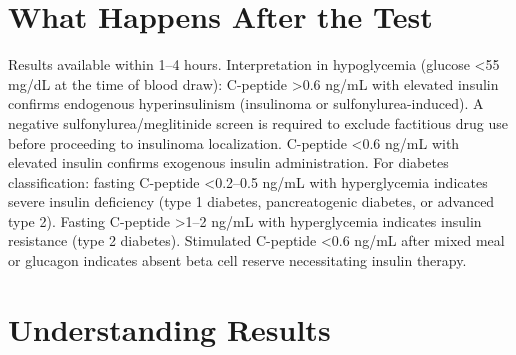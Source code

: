 \section*{What Happens After the Test}
Results available within 1--4 hours. Interpretation in hypoglycemia (glucose <55 mg/dL at the time of blood draw): C-peptide >0.6 ng/mL with elevated insulin confirms endogenous hyperinsulinism (insulinoma or sulfonylurea-induced). A negative sulfonylurea/meglitinide screen is required to exclude factitious drug use before proceeding to insulinoma localization. C-peptide <0.6 ng/mL with elevated insulin confirms exogenous insulin administration. For diabetes classification: fasting C-peptide <0.2--0.5 ng/mL with hyperglycemia indicates severe insulin deficiency (type 1 diabetes, pancreatogenic diabetes, or advanced type 2). Fasting C-peptide >1--2 ng/mL with hyperglycemia indicates insulin resistance (type 2 diabetes). Stimulated C-peptide <0.6 ng/mL after mixed meal or glucagon indicates absent beta cell reserve necessitating insulin therapy.

\section*{Understanding Results}

